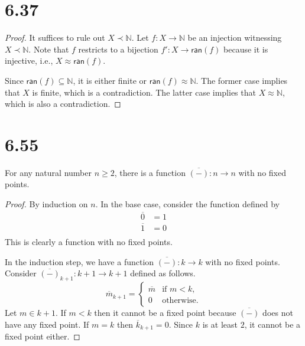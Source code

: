 \documentclass[a4paper]{article}
\newcommand{\ran}{\mathsf{ran}}
\newcommand{\N}{\mathbb{N}}
\newcommand{\To}[3]{#1\colon#2\to#3}
\begin{document}
\section*{6.37}
\begin{proof}
  It suffices to rule out $X \prec \N$.
  Let $\To{f}{X}{\N}$ be an injection witnessing $X \prec \N$.
  Note that $f$ restricts to a bijection $\To{f'}{X}{\ran(f)}$ because it is injective, i.e., $X \approx \ran(f)$.

  Since $\ran(f) \subseteq \N$, it is either finite or $\ran(f) \approx \N$.
  The former case implies that $X$ is finite, which is a contradiction.
  The latter case implies that $X \approx \N$, which is also a contradiction.
\end{proof}

\section*{6.55}
\begin{lemma}\label{thm:no-fixed-points}
  For any natural number $n \geq 2$, there is a function $\To{\overline{(-)}}{n}{n}$ with no fixed points.
\end{lemma}
\begin{proof}
  By induction on $n$.
  In the base case, consider the function defined by
  \begin{align*}
    \overline{0} &= 1\\
    \overline{1} &= 0\\
  \end{align*}
  This is clearly a function with no fixed points.

  In the induction step, we have a function $\To{\overline{(-)}}{k}{k}$ with no fixed points.
  Consider $\To{\overline{(-)}_{k+1}}{k+1}{k+1}$ defined as follows.
  \[
    \overline{m}_{k+1} =
    \begin{cases}
      \overline{m} & \text{if $m < k$,}\\
      0 & \text{otherwise.}
    \end{cases}
  \]
  Let $m \in k + 1$.
  If $m < k$ then it cannot be a fixed point because $\overline{(-)}$ does not have any fixed point.
  If $m = k$ then $\overline{k}_{k+1} = 0$.
  Since $k$ is at least $2$, it cannot be a fixed point either.
\end{proof}
\end{document}
